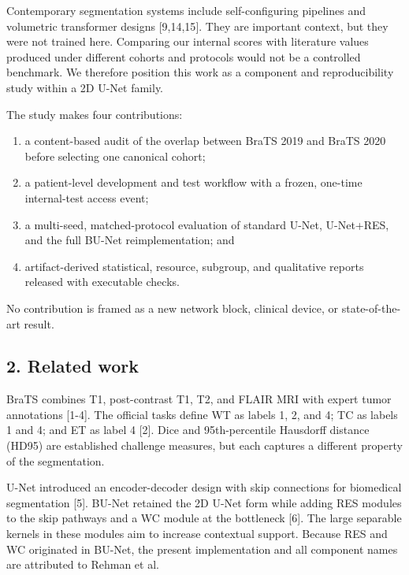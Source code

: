 \documentclass[
  10pt,
  letterpaper,
]{article}
\providecommand{\tightlist}{%
  \setlength{\itemsep}{0pt}\setlength{\parskip}{0pt}}
\begin{document}
Contemporary segmentation systems include self-configuring pipelines and
volumetric transformer designs {[}9,14,15{]}. They are important
context, but they were not trained here. Comparing our internal scores
with literature values produced under different cohorts and protocols
would not be a controlled benchmark. We therefore position this work as
a component and reproducibility study within a 2D U-Net family.

The study makes four contributions:

\begin{enumerate}
\def\labelenumi{\arabic{enumi}.}
\tightlist
\item
  a content-based audit of the overlap between BraTS 2019 and BraTS 2020
  before selecting one canonical cohort;
\item
  a patient-level development and test workflow with a frozen, one-time
  internal-test access event;
\item
  a multi-seed, matched-protocol evaluation of standard U-Net,
  U-Net+RES, and the full BU-Net reimplementation; and
\item
  artifact-derived statistical, resource, subgroup, and qualitative
  reports released with executable checks.
\end{enumerate}

No contribution is framed as a new network block, clinical device, or
state-of-the-art result.

\subsection{2. Related work}\label{related-work}

BraTS combines T1, post-contrast T1, T2, and FLAIR MRI with expert tumor
annotations {[}1-4{]}. The official tasks define WT as labels 1, 2, and
4; TC as labels 1 and 4; and ET as label 4 {[}2{]}. Dice and
95th-percentile Hausdorff distance (HD95) are established challenge
measures, but each captures a different property of the segmentation.

U-Net introduced an encoder-decoder design with skip connections for
biomedical segmentation {[}5{]}. BU-Net retained the 2D U-Net form while
adding RES modules to the skip pathways and a WC module at the
bottleneck {[}6{]}. The large separable kernels in these modules aim to
increase contextual support. Because RES and WC originated in BU-Net,
the present implementation and all component names are attributed to
Rehman et al.
\end{document}
